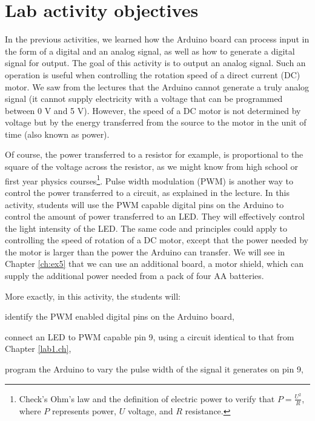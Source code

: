 \documentclass[12pt]{book}
\begin{document}
\section{Lab activity objectives}

In the previous activities, we learned how the Arduino board can
process input in the form of a digital and an analog signal, as well
as how to generate a digital signal for output. The goal of this
activity is to output an analog signal. Such an operation is useful
when controlling the rotation speed of a direct current (DC) motor. We
saw from the lectures that the Arduino cannot generate a
truly analog signal (it cannot supply electricity with a voltage
that can be programmed between 0 V and 5 V). However, the speed of a DC
motor is not determined by voltage but by the energy 
transferred from the source to the motor in the unit of time (also
known as power). 

Of course, the power transferred to a resistor for example, is
proportional to the square of the voltage across the resistor, as we
might know from high school or first year physics
courses\footnote{Check's Ohm's law and the definition of electric
  power to verify that $P = \frac{U^2}{R}$, where $P$ represents
  power, $U$ voltage, and $R$ resistance.}. Pulse width
modulation (PWM) is another way to control the power transferred to a
circuit, as explained in the lecture. In this activity, students will
use the PWM capable digital pins on the Arduino to control the amount
of power transferred to an LED. They will effectively control the
light intensity of the LED. The same code and principles could apply
to controlling the speed of rotation of a DC motor, except that the
power needed by the motor is larger than the power the Arduino can
transfer. We will see in Chapter \ref{ch:ex5} that we can use an
additional board, a motor shield, which can supply the additional
power needed from a pack of four AA batteries. 

More exactly, in this activity, the students will:
\begin{compactitem}[--]
\item identify the PWM enabled digital pins on the Arduino board,
\item connect an LED to PWM capable pin 9, using a circuit identical to that from
  Chapter \ref{lab1.ch},
\item  program the Arduino to vary the pulse width of the signal
  it generates on pin 9,
\end{compactitem}
\end{document}

